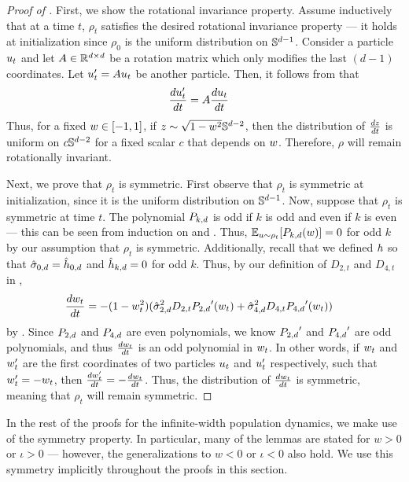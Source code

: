 \begin{proof}[Proof of ]
First, we show the rotational invariance property. Assume inductively that at a time $t$, $\rho_t$ satisfies the desired rotational invariance property --- it holds at initialization since $\rho_0$ is the uniform distribution on $\mathbb{S}^{d - 1}$. Consider a particle $u_t$ and let $A \in \mathbb{R}^{d \times d}$ be a rotation matrix which only modifies the last $(d - 1)$ coordinates. Let $u'_t = Au_t$ be another particle. Then, it follows from  that
\begin{align}
\frac{du_t'}{dt} & = A \frac{du_t}{dt}
\end{align}
Thus, for a fixed $w \in [-1, 1]$, if $z \sim \sqrt{1 - w^2} \mathbb{S}^{d - 2}$, then the distribution of $\frac{dz}{dt}$ is uniform on $c \mathbb{S}^{d - 2}$ for a fixed scalar $c$ that depends on $w$. Therefore, $\rho$ will remain rotationally invariant.

Next, we prove that $\rho_t$ is symmetric. First observe that $\rho_t$ is symmetric at initialization, since it is the uniform distribution on $\mathbb{S}^{d - 1}$. Now, suppose that $\rho_t$ is symmetric at time $t$. The polynomial ${P_{k, d}}$ is odd if $k$ is odd and even if $k$ is even --- this can be seen from induction on  and . Thus, $\operatorname*{\mathbb{E}}_{u \sim \rho_t}[{P_{k, d}}(w)] = 0$ for odd $k$ by our assumption that $\rho_t$ is symmetric. Additionally, recall that we defined $h$ so that $\hat{\sigma}_{0, d} = \hat{h}_{0, d}$ and $\hat{h}_{k, d} = 0$ for odd $k$. Thus, by our definition of $D_{2, t}$ and $D_{4, t}$ in ,
\begin{align}
\frac{dw_t}{dt}
& = -(1 - w_t^2) (\hat{\sigma}_{2, d}^2 D_{2, t} {P_{2, d}}'(w_t) + \hat{\sigma}_{4, d}^2 D_{4, t} {P_{4, d}}'(w_t))
\end{align}
by . Since ${P_{2, d}}$ and ${P_{4, d}}$ are even polynomials, we know ${P_{2, d}}'$ and ${P_{4, d}}'$ are odd polynomials, and thus $\frac{dw_t}{dt}$ is an odd polynomial in $w_t$. In other words, if $w_t$ and $w_t'$ are the first coordinates of two particles $u_t$ and $u_t'$ respectively, such that $w_t' = -w_t$, then $\frac{dw_t'}{dt} = -\frac{dw_t}{dt}$. Thus, the distribution of $\frac{dw_t}{dt}$ is symmetric, meaning that $\rho_t$ will remain symmetric.
\end{proof}

In the rest of the proofs for the infinite-width population dynamics, we make use of the symmetry property. In particular, many of the lemmas are stated for $w > 0$ or $\iota > 0$ --- however, the generalizations to $w < 0$ or $\iota < 0$ also hold. We use this symmetry implicitly throughout the proofs in this section.

